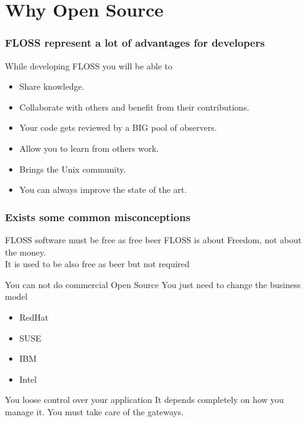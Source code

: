 \documentclass[hyperref={pdfpagelabels=false},xcolor=pst,pdf,fragile]{beamer}
\begin{document}
\section{Why Open Source}

\begin{frame}
  \frametitle{FLOSS represent a lot of advantages for developers}

  While developing FLOSS you will be able to
  \begin{itemize}
	\item Share knowledge.
	\item Collaborate with others and benefit from their contributions.
	\item Your code gets reviewed by a BIG pool of observers.
	\pause
	\item Allow you to learn from others work.
	\item Brings the Unix community.
	\item You can always improve the state of the art.
  \end{itemize}

\end{frame}

\begin{frame}
  \frametitle{Exists some common misconceptions}

  \begin{block}{FLOSS software must be free as free beer}
	  FLOSS is about Freedom, not about the money.\\

	  It is used to be also free as beer but not required
  \end{block}

  \pause
  \begin{block}{You can not do commercial Open Source}
	  You just need to change the business model
	\begin{itemize}
	  \item RedHat
	  \item SUSE
	  \item IBM
	  \item Intel
	\end{itemize}
  \end{block}

  \pause
  \begin{block}{You loose control over your application}
	It depends completely on how you manage it. You must take care of the
	gateways.
  \end{block}

\end{frame}
\end{document}
